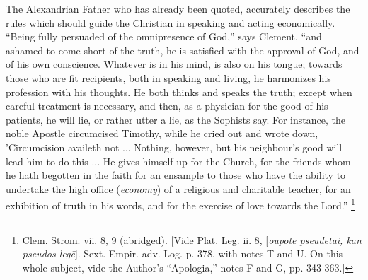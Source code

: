 The Alexandrian Father who has already been quoted, accurately
describes the rules which should guide the Christian in speaking and
acting economically. ``Being fully persuaded of the omnipresence
of God,'' says Clement, ``and ashamed to come short of the
truth, he is satisfied with the approval of God, and of his own
conscience. Whatever is in his mind, is also on his tongue; towards
those who are fit recipients, both in speaking and living, he
harmonizes his profession with his thoughts. He both thinks and speaks
the truth; except when careful treatment is necessary, and then, as a
physician for the good of his patients, he will lie, or rather
utter a lie, as the Sophists say. For instance, the noble Apostle
circumcised Timothy, while he cried out and wrote down, 'Circumcision
availeth not ... Nothing, however, but his neighbour's good will lead
him to do this ... He gives himself up for the Church, for the friends
whom he hath begotten in the faith for an ensample to those who have
the ability to undertake the high office (\emph{economy}) of a religious and
charitable teacher, for an exhibition of truth in his words, and for
the exercise of love towards the Lord.'' \footnote{Clem. Strom. vii. 8, 9 (abridged). [Vide
Plat. Leg. ii. 8, [\emph{oupote pseudetai, kan pseudos leg\={e}}].
Sext. Empir. adv. Log. p. 378, with notes T and U. On this whole
subject, vide the Author's ``Apologia,'' notes F and G, pp.
343-363.]}

